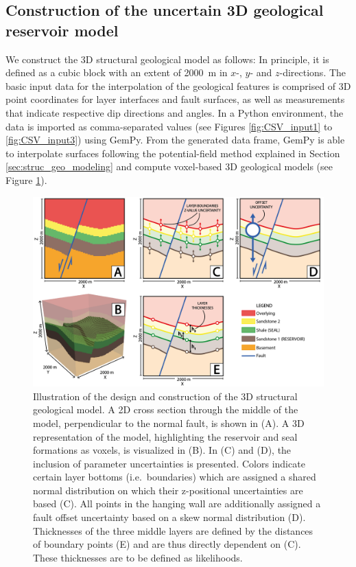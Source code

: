 		\subsection{Construction of the uncertain 3D geological reservoir model}\label{sec:3D_construction}
		We construct the 3D structural geological model as follows: In principle, it is defined as a cubic block with an extent of 2000~m in $x$-, $y$- and $z$-directions. The basic input data for the interpolation of the geological features is comprised of 3D point coordinates for layer interfaces and fault surfaces, as well as measurements that indicate respective dip directions and angles. In a Python environment, the data is imported as comma-separated values (see Figures \ref{fig:CSV_input1} to \ref{fig:CSV_input3}) using GemPy. From the generated data frame, GemPy is able to interpolate surfaces following the potential-field method explained in Section \ref{sec:struc_geo_modeling} and compute voxel-based 3D geological models (see Figure \ref{fig:3Dmodel_construction}).
		\begin{figure}[h]
			\centering
			\includegraphics[width=1\textwidth]{Figures/Uncertainties_Likelihoods.png}
			\caption{Illustration of the design and construction of the 3D structural geological model. A 2D cross section through the middle of the model, perpendicular to the normal fault, is shown in (A). A 3D representation of the model, highlighting the reservoir and seal formations as voxels, is visualized in (B). In (C) and (D), the inclusion of parameter uncertainties is presented. Colors indicate certain layer bottoms (i.e.\ boundaries) which are assigned a shared normal distribution on which their z-positional uncertainties are based (C). All points in the hanging wall are additionally assigned a fault offset uncertainty based on a skew normal distribution (D). Thicknesses of the three middle layers are defined by the distances of boundary points (E) and are thus directly dependent on (C). These thicknesses are to be defined as likelihoods.}\label{fig:3Dmodel_construction}
		\end{figure}\\
